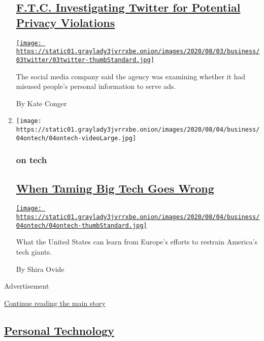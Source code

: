 \begin{enumerate}
  \hypertarget{ftc-investigating-twitter-for-potential-privacy-violations}{%
  \subsection{\texorpdfstring{\href{/2020/08/03/technology/ftc-twitter-privacy-violations.html}{F.T.C.
  Investigating Twitter for Potential Privacy
  Violations}}{F.T.C. Investigating Twitter for Potential Privacy Violations}}\label{ftc-investigating-twitter-for-potential-privacy-violations}}

  \href{/2020/08/03/technology/ftc-twitter-privacy-violations.html}{\texttt{[image: https://static01.graylady3jvrrxbe.onion/images/2020/08/03/business/03twitter/03twitter-thumbStandard.jpg]}}

  The social media company said the agency was examining whether it had
  misused people's personal information to serve ads.

  By Kate Conger
\item
  \texttt{[image: https://static01.graylady3jvrrxbe.onion/images/2020/08/04/business/04ontech/04ontech-videoLarge.jpg]}

  \hypertarget{on-tech}{%
  \subsubsection{on tech}\label{on-tech}}

  \hypertarget{when-taming-big-tech-goes-wrong}{%
  \subsection{\texorpdfstring{\href{/2020/08/04/technology/europe-big-tech.html}{When
  Taming Big Tech Goes
  Wrong}}{When Taming Big Tech Goes Wrong}}\label{when-taming-big-tech-goes-wrong}}

  \href{/2020/08/04/technology/europe-big-tech.html}{\texttt{[image: https://static01.graylady3jvrrxbe.onion/images/2020/08/04/business/04ontech/04ontech-thumbStandard.jpg]}}

  What the United States can learn from Europe's efforts to restrain
  America's tech giants.

  By Shira Ovide
\end{enumerate}

Advertisement

\protect\hyperlink{after-mid1}{Continue reading the main story}

\hypertarget{personal-technology}{%
\subsection{\texorpdfstring{\href{/section/technology/personaltech}{Personal
Technology}}{Personal Technology}}\label{personal-technology}}

